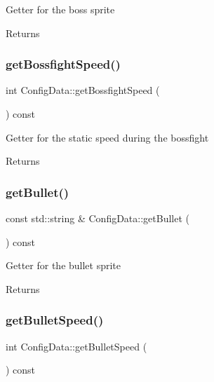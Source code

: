 Getter for the boss sprite \begin{DoxyReturn}{Returns}

\end{DoxyReturn}
\mbox{\label{classConfigData_ae74cc34be85fd4265e491c2717ab9638}} 
\subsubsection{\texorpdfstring{get\+Bossfight\+Speed()}{getBossfightSpeed()}}
{\footnotesize\ttfamily int Config\+Data\+::get\+Bossfight\+Speed (\begin{DoxyParamCaption}{ }\end{DoxyParamCaption}) const}

Getter for the static speed during the bossfight \begin{DoxyReturn}{Returns}

\end{DoxyReturn}
\mbox{\label{classConfigData_a087b7790faec74ef110bd2d810338858}} 
\subsubsection{\texorpdfstring{get\+Bullet()}{getBullet()}}
{\footnotesize\ttfamily const std\+::string \& Config\+Data\+::get\+Bullet (\begin{DoxyParamCaption}{ }\end{DoxyParamCaption}) const}

Getter for the bullet sprite \begin{DoxyReturn}{Returns}

\end{DoxyReturn}
\mbox{\label{classConfigData_a0251ca808c712d27def8a6d164934a30}} 
\subsubsection{\texorpdfstring{get\+Bullet\+Speed()}{getBulletSpeed()}}
{\footnotesize\ttfamily int Config\+Data\+::get\+Bullet\+Speed (\begin{DoxyParamCaption}{ }\end{DoxyParamCaption}) const}

